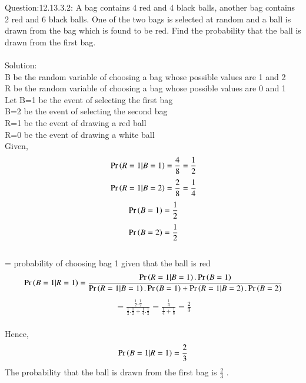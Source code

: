 \documentclass[journal,12pt,twocolumn]{IEEEtran}
\begin{document}
\maketitle
\newpage
\bigskip
Question:12.13.3.2: A bag contains 4 red and 4 black balls, another bag contains 2 red and 6 black balls. One of the two bags is selected at random and a ball is drawn from the bag which is found to be red. Find the probability that the ball is drawn from the first bag.
\\
\\
Solution:
\\B be the random variable of choosing a bag whose possible values are 1 and 2
\\R be the random variable of choosing a bag whose possible values are 0 and 1
\\Let B=1 be the event of selecting the first bag
\\B=2 be the event of selecting the second bag
\\R=1 be the event of drawing a red ball
\\R=0 be the event of drawing a white ball
\\Given,
$$ \\ \Pr\left(R=1|B=1\right)=\frac{4}{8}=\frac{1}{2} $$
$$ \\ \Pr\left(R=1|B=2\right)=\frac{2}{8}=\frac{1}{4} $$
$$ \\ \Pr\left(B=1\right)=\frac{1}{2} $$
$$ \\ \Pr\left(B=2\right)=\frac{1}{2} $$
\\ = probability of choosing bag 1 given that the ball is red 
$$ \\ \Pr\left(B=1|R=1\right)=\frac{\Pr\left(R=1|B=1\right).\Pr\left(B=1\right)}{\Pr\left(R=1|B=1\right).\Pr\left(B=1\right)+\Pr\left(R=1|B=2\right).\Pr\left(B=2\right)} $$
\begin{align}
=\frac{\frac{1}{2}.\frac{1}{2}}{\frac{1}{2}.\frac{1}{2}+\frac{1}{4}.\frac{1}{2}}
=\frac{\frac{1}{4}}{\frac{1}{4}+\frac{1}{8}}
=\frac{2}{3}
\end{align}
\\Hence, $$ \Pr\left(B=1|R=1\right)=\frac{2}{3}$$
The probability that the ball is drawn from the first bag is $\frac{2}{3}$ .
\end{document}
